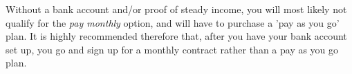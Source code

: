 \smallskip

Without a bank account and/or proof of steady income, you will most likely not qualify for the \emph{pay monthly} option, and will have to purchase a 'pay as you go' plan. It is highly recommended therefore that, after you have your bank account set up, you go and sign up for a monthly contract rather than a pay as you go plan.